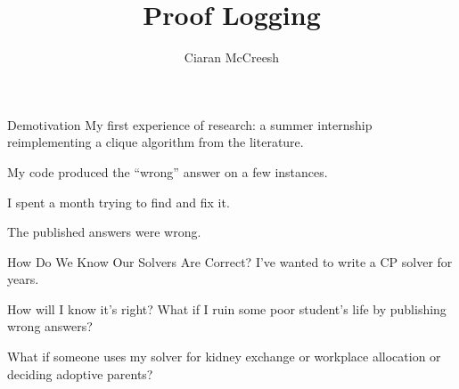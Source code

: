 \documentclass{beamer}
\author{Ciaran McCreesh}
\title{Proof Logging}
\begin{document}
{
    \begin{frame}
        \titlepage
    \end{frame}
}

\begin{frame}{Demotivation}
    My first experience of research: a summer internship reimplementing a clique algorithm from the literature.

    \bigskip

    My code produced the ``wrong'' answer on a few instances.

    \bigskip\pause

    I spent a month trying to find and fix it.

    \bigskip\pause

    The published answers were wrong.
\end{frame}

\begin{frame}{How Do We Know Our Solvers Are Correct?}
    I've wanted to write a CP solver for years.

    \bigskip

    How will I know it's right? What if I ruin some poor student's life by publishing wrong answers?

    \bigskip\pause

    What if someone uses my solver for kidney exchange or workplace allocation or deciding adoptive parents?
\end{frame}
\end{document}
